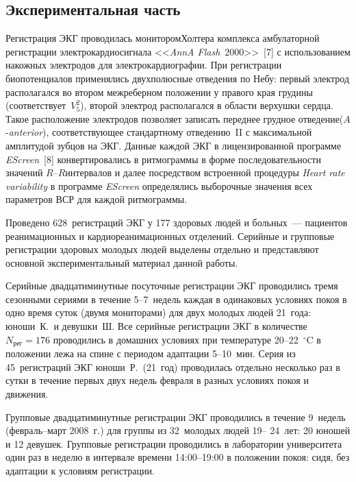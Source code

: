\begin{multicols}{2}
\vspace*{-12pt}
  
\section{Экспериментальная часть }
  
  Регистрация ЭКГ проводилась монитором\linebreak Холтера комплекса амбулаторной 
регистрации электрокардиосигнала <<\textit{AnnA Flash}~2000>>~[7] с 
использованием накожных электродов для электрокардиографии. При 
регистрации биопотенциалов применялись двухполюсные отведения по Небу: 
первый электрод располагался во втором межреберном положении у правого 
края грудины (соответствует~$V_5^2$), второй электрод располагался в области\linebreak 
верхушки сердца. Такое расположение электродов позволяет записать переднее 
грудное отведение\linebreak ($A$-\textit{anterior}), соответствующее стандартному 
отведению~II с максимальной амплитудой зубцов на ЭКГ. Данные каждой ЭКГ 
в лицензированной программе \textit{EScreen}~[8] конвертировались в 
ритмограммы в форме последовательности значений $R$--$R$\linebreak интервалов и 
далее посредством встроенной процедуры \textit{Heart rate variability} в 
программе \textit{EScreen} определялись выборочные значения всех параметров 
ВСР для каждой ритмограммы.
  
  Проведено 628~регистраций ЭКГ у 177 здоровых людей и больных~--- 
пациентов реанимационных и кардиореанимационных отделений. Серийные и 
групповые регистрации здоровых молодых людей выделены отдельно и 
представляют основной экспериментальный материал данной работы. 
  
  Серийные двадцатиминутные посуточные ре\-гист\-ра\-ции ЭКГ проводились 
тремя сезонными сериями в течение 5--7~недель каждая в одинаковых 
условиях покоя в одно время суток (двумя мониторами) для двух молодых 
людей 21~года: юноши~К.\ и девушки~Ш. Все серийные регистрации ЭКГ в 
количестве $N_{\mathrm{рег}} = 176$ проводились в домашних условиях при 
температуре 20--22~$^\circ$C в положении лежа на спине с периодом адаптации 
5--10~мин. Серия из 45~регистраций ЭКГ юноши~Р.\ (21~год) проводилась 
отдельно несколько раз в сутки в течение первых двух недель февраля в разных 
условиях покоя и движения. 
  
  Групповые двадцатиминутные регистрации ЭКГ проводились в течение 
9~недель (февраль--март 2008~г.) для группы из 32~молодых людей 19--
24~лет: 20 юношей и 12 девушек. Групповые регистрации проводились в 
лаборатории университета один раз в неделю в интервале времени 14:00--19:00 
в положении покоя: сидя, без адаптации к условиям регистрации. 


\end{multicols}
